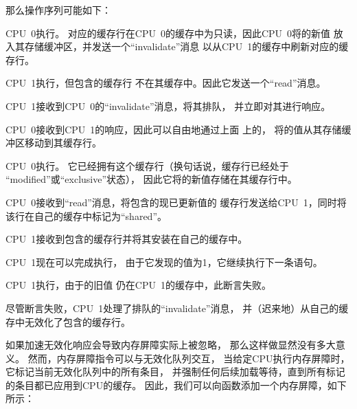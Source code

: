 那么操作序列可能如下：
\begin{fcvref}
\begin{sequence}
\item	CPU~0执行。
	对应的缓存行在CPU~0的缓存中为只读，因此CPU~0将的新值
	放入其存储缓冲区，并发送一个``invalidate''消息
	以从CPU~1的缓存中刷新对应的缓存行。
	\label{seq:app:whymb:Invalidate Queues and Memory Barriers}
\item	CPU~1执行，但包含的缓存行
	不在其缓存中。因此它发送一个``read''消息。
\item	CPU~1接收到CPU~0的``invalidate''消息，将其排队，
	并立即对其进行响应。
\item	CPU~0接收到CPU~1的响应，因此可以自由地通过上面
	上的，
	将的值从其存储缓冲区移动到其缓存行。
\item	CPU~0执行。
	它已经拥有这个缓存行（换句话说，缓存行已经处于
	``modified''或``exclusive''状态），
	因此它将的新值存储在其缓存行中。
\item	CPU~0接收到``read''消息，将包含的现已更新值的
	缓存行发送给CPU~1，同时将该行在自己的缓存中标记为``shared''。
\item	CPU~1接收到包含的缓存行并将其安装在自己的缓存中。
\item	CPU~1现在可以完成执行，
	由于它发现的值为1，它继续执行下一条语句。
\item	CPU~1执行，由于的旧值
	仍在CPU~1的缓存中，此断言失败。
\item	尽管断言失败，CPU~1处理了排队的``invalidate''消息，
	并（迟来地）从自己的缓存中无效化了包含的缓存行。
\end{sequence}
\end{fcvref}

\QuickQuizEnd

如果加速无效化响应会导致内存屏障实际上被忽略，
那么这样做显然没有多大意义。
然而，内存屏障指令可以与无效化队列交互，
当给定CPU执行内存屏障时，它标记当前无效化队列中的所有条目，
并强制任何后续加载等待，直到所有标记的条目都已应用到CPU的缓存。
因此，我们可以向函数添加一个内存屏障，如下所示：

